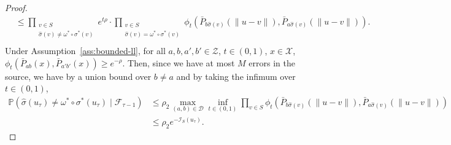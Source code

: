 \documentclass[11pt, a4paper]{amsart}
\newtheorem{lemma}[theorem]{Lemma}
\newcommand{\1}{\mathbf{1}}
\theoremstyle{definition}
\theoremstyle{remark}
\theoremstyle{definition}
\newcommand{\invisible}[1]{}
\begin{document}
{\begin{proof}
\begin{align}
        &\leq \prod_{\substack{v \in S \\ \hat{\sigma}(v) \neq \omega^* \circ  \sigma^*(v)}} e^{t\rho} \cdot \prod_{\substack{v \in S \\ \hat{\sigma}(v) = \omega^* \circ \sigma^*(v)}} \phi_t \left(\bar{P}_{b\hat{\sigma}(v)}(\|u-v\|), \bar{P}_{a\hat{\sigma}(v)}(\|u-v\|)\right). \\
    \end{align}
    Under Assumption~\ref{ass:bounded-ll}, for all $a,b,a',b' \in \mathcal Z$, $t\in (0,1)$, $x \in \mathcal X$, $\phi_t(\bar P_{ab}(x), \bar P_{a'b'}(x)) \geq e^{-\rho}$. Then, since we have at most $M$ errors in the source, we have by a union bound over $b \neq a$ and by taking the infimum over $t \in (0,1)$,
    \begin{align}
        \mathbb P(\hat\sigma(u_\tau) \neq \omega^* \circ \sigma^*(u_\tau) \mid \mathcal F_{\tau-1})
        & \leq \rho_2 \max_{(a,b) \in \mathcal D} \inf_{t\in (0,1)} \prod_{v \in S} \phi_t \left(\bar{P}_{b\hat{\sigma}(v)}(\|u-v\|), \bar{P}_{a\hat{\sigma}(v)}(\|u-v\|)\right)  \\
        &\leq \rho_2 e^{-\mathcal{I}_S(u_\tau)}.
    \end{align}
\end{proof}
}


\invisible{
\begin{lemma}\label{lem:binomial_domination}
    Let $(\mathcal F_t)_{t\ge 0}$ be a filtration, and let $((Z_t)_{t\ge 1}$ an adapted sequence of random variables with value in $\{0,1\}$. Assume there exists $p\in[0,1]$ such that $\mathbb{P}(Z_t=1\mid \mathcal F_{t-1})\le p$ for all $t\ge 1$. Let $T\subset \mathbb N$ a finite set such that $\{t \in T\} \in \mathcal{F}_{t-1}$ for every $t\geq 1$. Then
    $\sum_{t\in T} Z_t \preceq \operatorname{Bin}(|T|,p)$.
\end{lemma}
\begin{proof}
We order $T$ as $t_1<\cdots < t_m $ when $|T|=m$. Denote $S_j\coloneqq \sum_{i=1}^j Z_{t_i}$ with $S_0\coloneqq 0$.
By induction on $m$. If $m=0$, then $T = \emptyset$ almost surely and the result is immediate.
Assume the result holds for every set of size $m-1$, and let $x\in \mathbb Z$ since both random variables are discrete,
\begin{align}
    \mathbb P\left(S_m\ge x\right)
    &
     = \mathbb P\left(S_{m-1}\ge  x \right)
    + 
    \mathbb E\left(
        \mathbf 1_{\{ S_{m-1} =  x-1\}}
        \mathbb{P}(Z_{t_m} = 1\mid \mathcal F_{t_m-1})
    \right) \\
    &\le
    \mathbb P\left(S_{m-1}\ge x \right)
    +
    p\mathbb P\left(S_{m-1}= x  -1\right)\\
    &=
    (1-p)\mathbb P\left(S_{m-1}\ge  x \right)
    +
    p\mathbb P\left(S_{m-1}\ge  x  -1\right) \\ 
    &\leq(1-p)\mathbb P\left(\operatorname{Bin}(m-1,p)\ge x \right) + 
    p\mathbb P\left(\operatorname{Bin}(m-1,p)\ge  x -1\right)\\
    &= \mathbb P\left(\operatorname{Bin}(m,p)\ge  x \right).
\end{align}
\end{proof}
}
\end{document}
